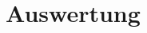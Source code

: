 \documentclass[12pt,english,ngerman]{scrartcl}
\begin{document}

\section{Auswertung}\label{sec:Auswertung}
\end{document}

